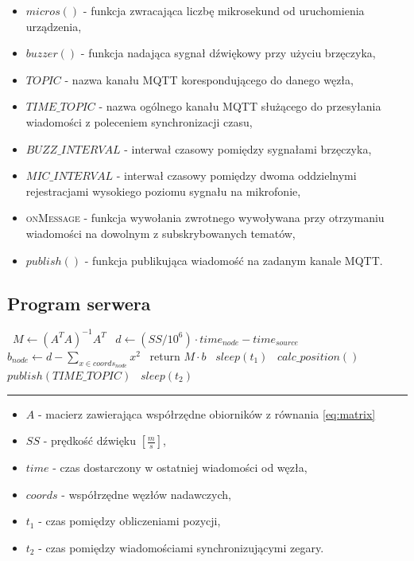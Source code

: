 \begin{itemize}
    \item $micros()$ {-} funkcja zwracająca liczbę mikrosekund od uruchomienia urządzenia,
    \item $buzzer()$ {-} funkcja nadająca sygnał dźwiękowy przy użyciu brzęczyka,
    \item $TOPIC$ {-} nazwa kanału MQTT korespondującego do danego węzła,
    \item $TIME\_TOPIC$ {-} nazwa ogólnego kanału MQTT służącego do przesyłania wiadomości z poleceniem synchronizacji czasu,
    \item $BUZZ\_INTERVAL$ {-} interwał czasowy pomiędzy sygnałami brzęczyka,
    \item $MIC\_INTERVAL$ {-} interwał czasowy pomiędzy dwoma oddzielnymi rejestracjami wysokiego poziomu sygnału na mikrofonie,
    \item \textsc{onMessage} {-} funkcja wywołania zwrotnego wywoływana przy otrzymaniu wiadomości na dowolnym z subskrybowanych tematów,
    \item $publish()$ {-} funkcja publikująca wiadomość na zadanym kanale MQTT.
\end{itemize}

\subsection{Program serwera}

\begin{center}
    \label{alg:server}
    \begin{algorithmic}[1]
        \State\ $M \gets {\left(A^T A\right)}^{-1} A^T$
                \State\ $d \gets (SS / 10^{6}) \cdot time_{node} - time_{source}$
                \State\ $b_{node} \gets d - \sum_{x \in coords_{node}}{x^2}$
            \EndFor
            \State\ return $M \cdot b$
        \EndFunction
            \State\ $sleep(t_1)$
            \State\ $calc\_position()$
        \EndLoop
            \State\ $publish(TIME\_TOPIC)$
            \State\ $sleep(t_2)$
        \EndLoop
    \end{algorithmic}
    \vspace{5pt}
    \hrule
\end{center}

\begin{itemize}
    \item $A$ - macierz zawierająca współrzędne obiorników z równania \ref{eq:matrix}
    \item $SS$ {-} prędkość dźwięku $\left[\frac{m}{s}\right]$,
    \item $time$ {-} czas dostarczony w ostatniej wiadomości od węzła,
    \item $coords$ {-} współrzędne węzłów nadawczych,
    \item $t_1$ {-} czas pomiędzy obliczeniami pozycji,
    \item $t_2$ {-} czas pomiędzy wiadomościami synchronizującymi zegary.
\end{itemize}

